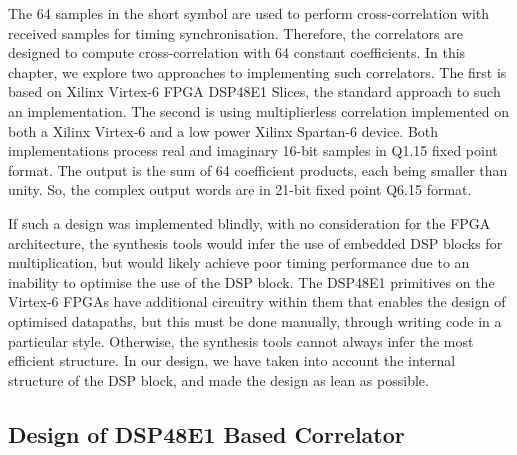 The 64 samples in the short symbol are used to perform cross-correlation with received samples for timing synchronisation.
Therefore, the correlators are designed to compute cross-correlation with 64 constant coefficients.
In this chapter, we explore two approaches to implementing such correlators.
The first is based on Xilinx Virtex-6 FPGA DSP48E1 Slices, the standard approach to such an implementation.
The second is using multiplierless correlation implemented on both a Xilinx Virtex-6 and a low power Xilinx Spartan-6 device.
Both implementations process real and imaginary 16-bit samples in Q1.15 fixed point format.
The output is the sum of 64 coefficient products, each being smaller than unity.
So, the complex output words are in 21-bit fixed point Q6.15 format.

If such a design was implemented blindly, with no consideration for the FPGA architecture, the synthesis tools would infer the use of embedded DSP blocks for multiplication, but would likely achieve poor timing performance due to an inability to optimise the use of the DSP block.
The DSP48E1 primitives on the Virtex-6 FPGAs have additional circuitry within them that enables the design of optimised datapaths, but this must be done manually, through writing code in a particular style.
Otherwise, the synthesis tools cannot always infer the most efficient structure.
In our design, we have taken into account the internal structure of the DSP block, and made the design as lean as possible.

\subsection{Design of DSP48E1 Based Correlator}

